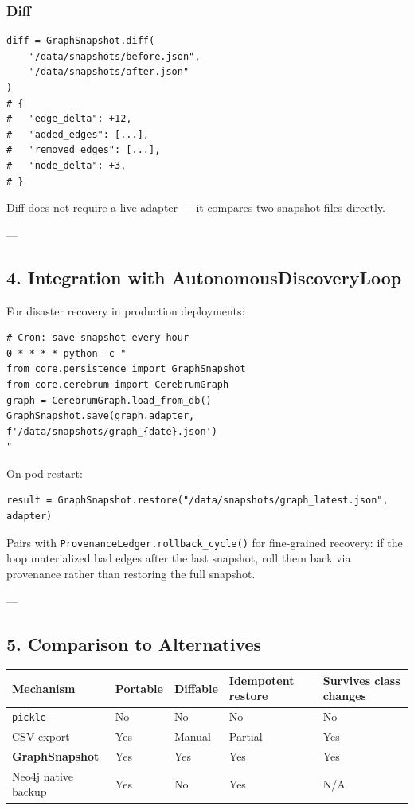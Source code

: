 \subsubsection{Diff}

\begin{lstlisting}
diff = GraphSnapshot.diff(
    "/data/snapshots/before.json",
    "/data/snapshots/after.json"
)
# {
#   "edge_delta": +12,
#   "added_edges": [...],
#   "removed_edges": [...],
#   "node_delta": +3,
# }
\end{lstlisting}

Diff does not require a live adapter — it compares two snapshot files directly.

---

\subsection{4. Integration with AutonomousDiscoveryLoop}

For disaster recovery in production deployments:

\begin{lstlisting}
# Cron: save snapshot every hour
0 * * * * python -c "
from core.persistence import GraphSnapshot
from core.cerebrum import CerebrumGraph
graph = CerebrumGraph.load_from_db()
GraphSnapshot.save(graph.adapter, f'/data/snapshots/graph_{date}.json')
"
\end{lstlisting}

On pod restart:
\begin{lstlisting}
result = GraphSnapshot.restore("/data/snapshots/graph_latest.json", adapter)
\end{lstlisting}

Pairs with \texttt{ProvenanceLedger.rollback\_cycle()} for fine-grained recovery: if the loop mater\-ialized bad edges after the last snapshot, roll them back via provenance rather than restoring the full snapshot.

---

\subsection{5. Comparison to Altern\-atives}

\begin{center}
{\footnotesize
\begin{tabularx}{\columnwidth}{|>{\raggedright\arraybackslash}X|>{\raggedright\arraybackslash}X|>{\raggedright\arraybackslash}X|>{\raggedright\arraybackslash}X|>{\raggedright\arraybackslash}X|}
\hline
Mechanism & Portable & Diffable & Idempotent restore & Survives class changes \\ \hline
\texttt{pickle} & No & No & No & No \\ \hline
CSV export & Yes & Manual & Partial & Yes \\ \hline
\textbf{GraphSnapshot} & Yes & Yes & Yes & Yes \\ \hline
Neo4j native backup & Yes & No & Yes & N/A \\ \hline
\end{tabularx}
}
\end{center}

